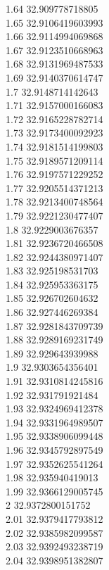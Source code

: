 {1.64	32.909778718805\\
1.65	32.9106419603993\\
1.66	32.9114994069868\\
1.67	32.9123510668963\\
1.68	32.9131969487533\\
1.69	32.9140370614747\\
1.7	32.9148714142643\\
1.71	32.9157000166083\\
1.72	32.9165228782714\\
1.73	32.9173400092923\\
1.74	32.9181514199803\\
1.75	32.9189571209114\\
1.76	32.9197571229252\\
1.77	32.9205514371213\\
1.78	32.9213400748564\\
1.79	32.9221230477407\\
1.8	32.9229003676357\\
1.81	32.9236720466508\\
1.82	32.9244380971407\\
1.83	32.925198531703\\
1.84	32.925953363175\\
1.85	32.926702604632\\
1.86	32.927446269384\\
1.87	32.9281843709739\\
1.88	32.9289169231749\\
1.89	32.929643939988\\
1.9	32.9303654356401\\
1.91	32.9310814245816\\
1.92	32.931791921484\\
1.93	32.9324969412378\\
1.94	32.9331964989507\\
1.95	32.9338906099448\\
1.96	32.9345792897549\\
1.97	32.9352625541264\\
1.98	32.935940419013\\
1.99	32.9366129005745\\
2	32.9372800151752\\
2.01	32.9379417793812\\
2.02	32.9385982099587\\
2.03	32.9392493238719\\
2.04	32.9398951382807\\
}
